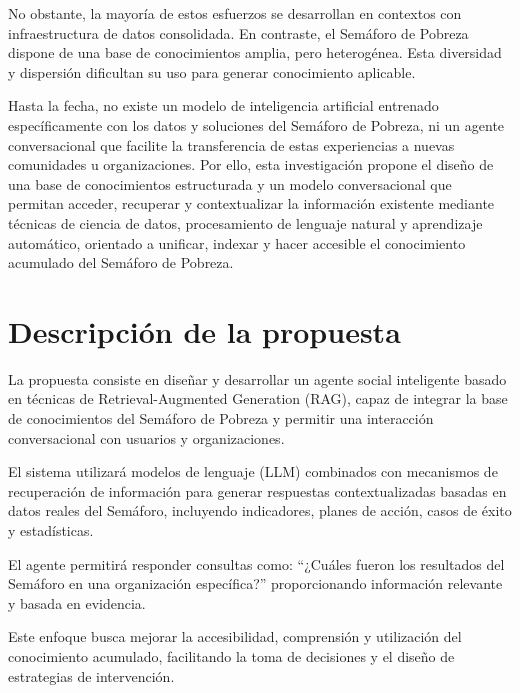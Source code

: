 \documentclass{article}
\begin{document}
No obstante, la mayoría de estos esfuerzos se desarrollan en contextos con infraestructura de datos consolidada. En contraste, el Semáforo de Pobreza dispone de una base de conocimientos amplia, pero heterogénea. Esta diversidad y dispersión dificultan su uso para generar conocimiento aplicable.

Hasta la fecha, no existe un modelo de inteligencia artificial entrenado específicamente con los datos y soluciones del Semáforo de Pobreza, ni un agente conversacional que facilite la transferencia de estas experiencias a nuevas comunidades u organizaciones. Por ello, esta investigación propone el diseño de una base de conocimientos estructurada y un modelo conversacional que permitan acceder, recuperar y contextualizar la información existente mediante técnicas de ciencia de datos, procesamiento de lenguaje natural y aprendizaje automático, orientado a unificar, indexar y hacer accesible el conocimiento acumulado del Semáforo de Pobreza.

\section{Descripción de la propuesta}

La propuesta consiste en diseñar y desarrollar un agente social inteligente basado en técnicas de Retrieval-Augmented Generation (RAG), capaz de integrar la base de conocimientos del Semáforo de Pobreza y permitir una interacción conversacional con usuarios y organizaciones.

El sistema utilizará modelos de lenguaje (LLM) combinados con mecanismos de recuperación de información para generar respuestas contextualizadas basadas en datos reales del Semáforo, incluyendo indicadores, planes de acción, casos de éxito y estadísticas.

El agente permitirá responder consultas como: ``¿Cuáles fueron los resultados del Semáforo en una organización específica?'' proporcionando información relevante y basada en evidencia.

Este enfoque busca mejorar la accesibilidad, comprensión y utilización del conocimiento acumulado, facilitando la toma de decisiones y el diseño de estrategias de intervención.

\end{document}
